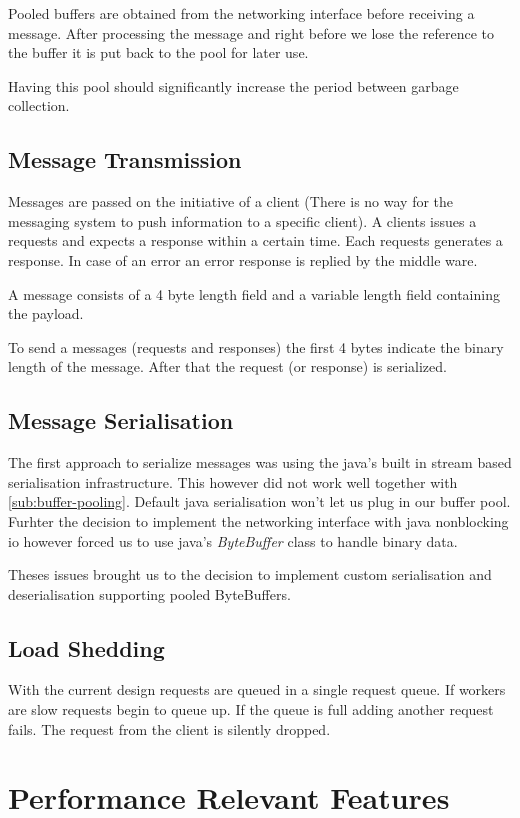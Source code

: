 \documentclass[a4paper]{article}
\begin{document}
Pooled buffers are obtained from the networking interface before receiving a message. After processing the message and right before we lose the reference to the buffer it is put back to the pool for later use.

Having this pool should significantly increase the period between garbage collection.

\subsection{Message Transmission}
Messages are passed on the initiative of a client (There is no way for the messaging system to push information to a specific client). A clients issues a requests and expects a response within a certain time. Each requests generates a response. In case of an error an error response is replied by the middle ware.

A message consists of a 4 byte length field and a variable length field containing the payload.

To send a messages (requests and responses) the first 4 bytes indicate the binary length of the message. After that the request (or response) is serialized.

\subsection{Message Serialisation}

The first approach to serialize messages was using the java's built in stream based serialisation infrastructure. This however did not work well together with \ref{sub:buffer-pooling}. Default java serialisation won't let us plug in our buffer pool. Furhter the decision to implement the networking interface with java nonblocking io however forced us to use java's \textit{ByteBuffer} class to handle binary data.

Theses issues brought us to the decision to implement custom serialisation and deserialisation supporting pooled ByteBuffers.

\subsection{Load Shedding}
With the current design requests are queued in a single request queue. If workers are slow requests begin to queue up. If the queue is full adding another request fails. The request from the client is silently dropped.


\section{Performance Relevant Features}
\end{document}
